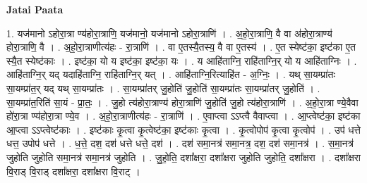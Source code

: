 \documentclass[17pt]{extarticle}
\begin{document}
\textbf{Jatai Paata} \newline

1. यज॑मानो ऽहोरा॒त्रा ण्य॑होरा॒त्राणि॒ यज॑मानो॒ यज॑मानो ऽहोरा॒त्राणि॑ । . अ॒हो॒रा॒त्राणि॒ वै वा अ॑होरा॒त्राण्य॑ होरा॒त्राणि॒ वै । . अ॒हो॒रा॒त्राणीत्य॑हः - रा॒त्राणि॑ । . वा ए॒तस्यै॒तस्य॒ वै वा ए॒तस्य॑ । . ए॒त स्येष्ट॑का॒ इष्ट॑का ए॒त स्यै॒त स्येष्ट॑काः । . इष्ट॑का॒ यो य इष्ट॑का॒ इष्ट॑का॒ यः । . य आहि॑ताग्नि॒ राहि॑ताग्नि॒र् यो य आहि॑ताग्निः । . आहि॑ताग्नि॒र् यद् यदाहि॑ताग्नि॒ राहि॑ताग्नि॒र् यत् । . आहि॑ताग्नि॒रित्याहि॑त - अ॒ग्निः॒ । . यथ् सा॒यम्प्रा॑तः सा॒यम्प्रा॑त॒र् यद् यथ् सा॒यम्प्रा॑तः । . सा॒यम्प्रा॑तर् जु॒होति॑ जु॒होति॑ सा॒यम्प्रा॑तः सा॒यम्प्रा॑तर् जु॒होति॑ । . सा॒यम्प्रा॑त॒रिति॑ सा॒यं - प्रा॒तः॒ । . जु॒हो त्य॑होरा॒त्राण्य॑ होरा॒त्राणि॑ जु॒होति॑ जु॒हो त्य॑होरा॒त्राणि॑ । . अ॒हो॒रा॒त्रा ण्ये॒वैवा हो॑रा॒त्रा ण्य॑होरा॒त्रा ण्ये॒व । . अ॒हो॒रा॒त्राणीत्य॑हः - रा॒त्राणि॑ । . ए॒वाप्त्वा ऽऽप्त्वै वैवाप्त्वा । . आ॒प्त्वेष्ट॑का॒ इष्ट॑का आ॒प्त्वा ऽऽप्त्वेष्ट॑काः । . इष्ट॑काः कृ॒त्वा कृ॒त्वेष्ट॑का॒ इष्ट॑काः कृ॒त्वा । . कृ॒त्वोपोप॑ कृ॒त्वा कृ॒त्वोप॑ । . उप॑ धत्ते धत्त॒ उपोप॑ धत्ते । . ध॒त्ते॒ दश॒ दश॑ धत्ते धत्ते॒ दश॑ । . दश॑ समा॒नत्र॑ समा॒नत्र॒ दश॒ दश॑ समा॒नत्र॑ । . स॒मा॒नत्र॑ जुहोति जुहोति समा॒नत्र॑ समा॒नत्र॑ जुहोति । . जु॒हो॒ति॒ दशा᳚क्षरा॒ दशा᳚क्षरा जुहोति जुहोति॒ दशा᳚क्षरा । . दशा᳚क्षरा वि॒राड् वि॒राड् दशा᳚क्षरा॒ दशा᳚क्षरा वि॒राट् । \newline
\end{document}
